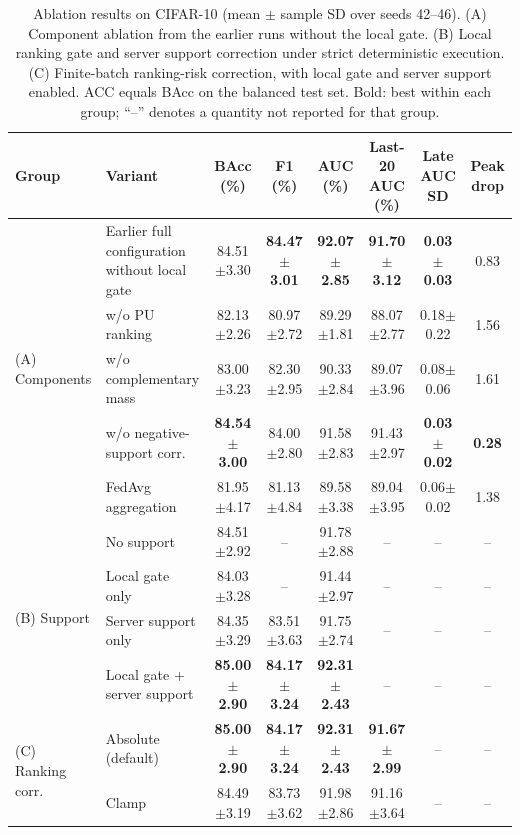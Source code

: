\documentclass[lettersize,journal]{IEEEtran}
\begin{document}
\begin{table}[!t]
\centering
\caption{Ablation results on CIFAR-10 (mean $\pm$ sample SD over seeds 42--46). (A) Component ablation from the earlier runs without the local gate. (B) Local ranking gate and server support correction under strict deterministic execution. (C) Finite-batch ranking-risk correction, with local gate and server support enabled. ACC equals BAcc on the balanced test set. Bold: best within each group; ``--'' denotes a quantity not reported for that group.}
\label{tab:ablation}
\scriptsize
\setlength{\tabcolsep}{4.5pt}
\begin{tabular}{llcccccc}
\toprule
Group & Variant & BAcc (\%) & F1 (\%) & AUC (\%) & Last-20 AUC (\%) & Late AUC SD & Peak drop \\
\midrule
\multirow{5}{*}{(A) Components}
& \makecell[l]{Earlier full configuration\\without local gate} & 84.51$\pm$3.30 & \textbf{84.47$\pm$3.01} & \textbf{92.07$\pm$2.85} & \textbf{91.70$\pm$3.12} & \textbf{0.03$\pm$0.03} & 0.83 \\
& w/o PU ranking & 82.13$\pm$2.26 & 80.97$\pm$2.72 & 89.29$\pm$1.81 & 88.07$\pm$2.77 & 0.18$\pm$0.22 & 1.56 \\
& w/o complementary mass & 83.00$\pm$3.23 & 82.30$\pm$2.95 & 90.33$\pm$2.84 & 89.07$\pm$3.96 & 0.08$\pm$0.06 & 1.61 \\
& w/o negative-support corr. & \textbf{84.54$\pm$3.00} & 84.00$\pm$2.80 & 91.58$\pm$2.83 & 91.43$\pm$2.97 & \textbf{0.03$\pm$0.02} & \textbf{0.28} \\
& FedAvg aggregation & 81.95$\pm$4.17 & 81.13$\pm$4.84 & 89.58$\pm$3.38 & 89.04$\pm$3.95 & 0.06$\pm$0.02 & 1.38 \\
\midrule
\multirow{4}{*}{(B) Support}
& No support & 84.51$\pm$2.92 & -- & 91.78$\pm$2.88 & -- & -- & -- \\
& Local gate only & 84.03$\pm$3.28 & -- & 91.44$\pm$2.97 & -- & -- & -- \\
& Server support only & 84.35$\pm$3.29 & 83.51$\pm$3.63 & 91.75$\pm$2.74 & -- & -- & -- \\
& Local gate + server support & \textbf{85.00$\pm$2.90} & \textbf{84.17$\pm$3.24} & \textbf{92.31$\pm$2.43} & -- & -- & -- \\
\midrule
\multirow{2}{*}{(C) Ranking corr.}
& Absolute (default) & \textbf{85.00$\pm$2.90} & \textbf{84.17$\pm$3.24} & \textbf{92.31$\pm$2.43} & \textbf{91.67$\pm$2.99} & -- & -- \\
& Clamp & 84.49$\pm$3.19 & 83.73$\pm$3.62 & 91.98$\pm$2.86 & 91.16$\pm$3.64 & -- & -- \\
\bottomrule
\end{tabular}
\end{table}
\end{document}
